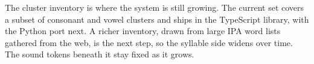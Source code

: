 

The cluster inventory is where the system is still growing. The current set covers a subset of consonant and vowel clusters and ships in the TypeScript library, with the Python port next. A richer inventory, drawn from large IPA word lists gathered from the web, is the next step, so the syllable side widens over time. The sound tokens beneath it stay fixed as it grows.
